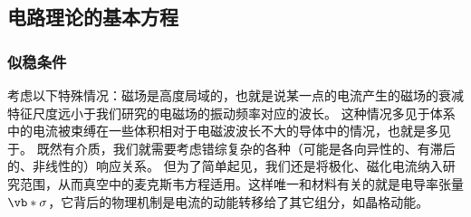 \subsection{电路理论的基本方程}

\subsubsection{似稳条件}

考虑以下特殊情况：磁场是高度局域的，也就是说某一点的电流产生的磁场的衰减特征尺度远小于我们研究的电磁场的振动频率对应的波长。
这种情况多见于体系中的电流被束缚在一些体积相对于电磁波波长不大的导体中的情况，也就是多见于。
既然有介质，我们就需要考虑错综复杂的各种（可能是各向异性的、有滞后的、非线性的）响应关系。
但为了简单起见，我们还是将极化、磁化电流纳入研究范围，从而真空中的麦克斯韦方程适用。这样唯一和材料有关的就是电导率张量$\vb*{\sigma}$，它背后的物理机制是电流的动能转移给了其它组分，如晶格动能。

